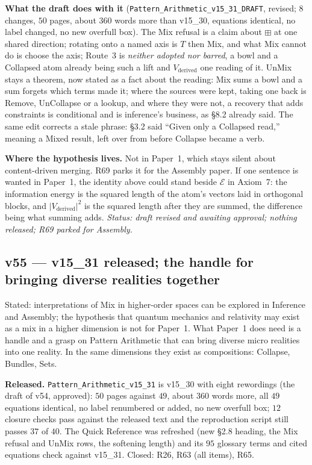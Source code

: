 \documentclass[11pt]{article}
\begin{document}
\textbf{What the draft does with it} (\texttt{Pattern\_Arithmetic\_v15\_31\_DRAFT}, revised; $8$ changes, $50$ pages, about $360$ words more than v15\_30, equations identical, no label changed, no new overfull box). The Mix refusal is a claim about $\boxplus$ at one shared direction; rotating onto a named axis is $T$ then Mix, and what Mix cannot do is choose the axis; Route~3 is \emph{neither adopted nor barred}, a bowl and a Collapsed atom already being such a lift
and $V_{\text{derived}}$ one reading of it. UnMix stays a theorem, now stated as a fact about the reading: Mix sums a bowl and a sum forgets which terms made it; where the sources were kept, taking one back is Remove, UnCollapse or a lookup, and where they were not, a recovery that adds constraints is conditional and is inference's business, as \S8.2 already said.
The same edit corrects a stale phrase: \S3.2 said ``Given only a Collapsed read,'' meaning a Mixed result, left over from before Collapse became a verb.

\textbf{Where the hypothesis lives.} Not in Paper~1, which stays silent about content-driven merging. R69 parks it for the Assembly paper. If one sentence is wanted in Paper~1, the identity above could stand beside $\mathcal E$ in Axiom~7: the information energy is the squared length of the atom's vectors laid in orthogonal blocks, and $\lvert V_{\text{derived}}\rvert^2$ is the squared length after they are summed, the difference being what summing adds.
\emph{Status: draft revised and awaiting approval; nothing released; R69 parked for Assembly.}


\subsection*{v55 --- v15\_31 released; the handle for bringing diverse realities together}
Stated: interpretations of Mix in higher-order spaces can be explored in Inference and Assembly; the hypothesis that quantum mechanics and relativity may exist as a mix in a higher dimension is not for Paper~1. What Paper~1 does need is a handle and a grasp on Pattern Arithmetic that can bring diverse micro realities into one reality. In the same dimensions they exist as compositions: Collapse, Bundles, Sets.

\textbf{Released.} \texttt{Pattern\_Arithmetic\_v15\_31} is v15\_30 with eight rewordings (the draft of v54, approved): $50$ pages against $49$, about $360$ words more, all $49$ equations identical, no label renumbered or added, no new overfull box; $12$ closure checks pass against the released text and the reproduction script still passes $37$ of $40$. The Quick Reference was refreshed
(new \S2.8 heading, the Mix refusal and UnMix rows, the softening length) and its $95$ glossary terms and cited equations check against v15\_31. Closed: R26, R63 (all items), R65.
\end{document}
